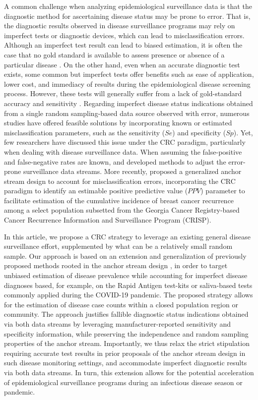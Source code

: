 \documentclass[useAMS,usenatbib,referee]{biom}
\begin{document}
A common challenge when analyzing epidemiological surveillance data is that the diagnostic method for ascertaining disease status may be prone to error. That is, the diagnostic results observed in disease surveillance programs may rely on imperfect tests or diagnostic devices,  which can lead to misclassification errors. Although an imperfect test result can lead to biased estimation, it is often the case that no gold standard is available to assess presence or absence of a particular disease \citep{Glasziou2008,Walter2012}. On the other hand, even when an accurate diagnostic test exists, some common but imperfect tests offer benefits such as ease of application, lower cost, and immediacy of results during the epidemiological disease screening process. However, these tests will generally suffer from a lack of gold-standard accuracy and sensitivity \citep{Soh2012}. Regarding imperfect disease status indications obtained from a single random sampling-based data source observed with error, numerous studies \citep{Levy1970,Rogan1978,Gastwirth1987} have offered feasible solutions by incorporating known or estimated misclassification parameters, such as the sensitivity ($Se$) and specificity ($Sp$). Yet, few researchers have discussed this issue under the CRC paradigm, particularly when dealing with disease surveillance data. When assuming the false-positive and false-negative rates are known,  \cite{Brenner1996} and \cite{Ramos2020} developed methods to adjust the error-prone surveillance data streams. More recently, \cite{Ge2023} proposed a generalized anchor stream design to account for misclassification errors, incorporating the CRC paradigm to identify an estimable positive predictive value ($PPV$) parameter to facilitate estimation of the cumulative incidence of breast cancer recurrence among a select population subsetted from the Georgia Cancer Registry-based Cancer Recurrence Information and Surveillance Program (CRISP). 

In this article, we propose a CRC strategy to leverage an existing general disease surveillance effort, supplemented by what can be a relatively small random sample. Our approach is based on an extension and generalization of previously proposed methods rooted in the anchor stream design \citep{Lyles2022a,Lyles2022b,Ge2023}, in order to target unbiased estimation of  disease prevalence while accounting for imperfect disease diagnoses based, for example, on the Rapid Antigen test-kits or saliva-based tests commonly applied during the COVID-19 pandemic. The proposed strategy allows for the estimation of disease case counts within a closed population region or community. The approach justifies fallible diagnostic status indications obtained via both data streams by leveraging manufacturer-reported sensitivity and specificity information, while preserving the independence and random sampling properties of the anchor stream. Importantly, we thus relax the strict stipulation requiring accurate test results in prior proposals of the anchor stream design \citep{Lyles2022a,Lyles2022b,Ge2023} in such disease monitoring settings, and accommodate imperfect diagnostic results via both data streams. In turn, this extension allows for the potential acceleration of epidemiological surveillance programs during an infectious disease season or pandemic. 
\end{document}
